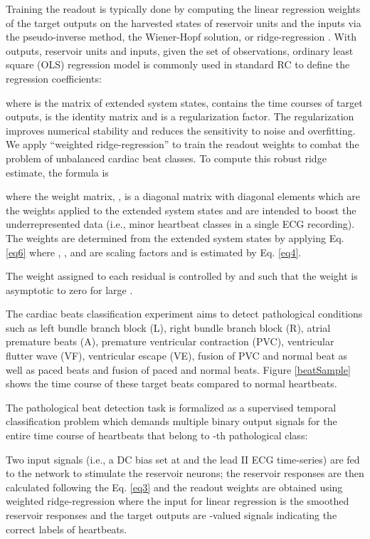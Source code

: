 \documentclass[review]{elsarticle}
\begin{document}
Training the readout is typically done by computing the linear regression weights of the target outputs on the harvested states of reservoir units and the inputs via the pseudo-inverse method, the Wiener-Hopf solution, or ridge-regression \cite{jaeger2001echo}. With  outputs,  reservoir units and  inputs, given the set  of  observations, ordinary least square (OLS) regression model is commonly used in standard RC to define the regression coefficients:


where  is the matrix of extended system states,  contains the time courses of target outputs,  is the identity matrix and  is a regularization
factor. The regularization improves numerical stability and reduces the sensitivity to noise and overfitting. We apply ``weighted ridge-regression'' \cite{ramsay1977comparative,montgomery2012introduction} to train the readout weights to combat the problem of unbalanced cardiac beat classes. To compute this robust ridge estimate, the formula is


where the weight matrix, , is a diagonal matrix with diagonal
elements  which are the weights applied to the extended system states and are intended to boost the underrepresented data (i.e., minor heartbeat classes in a single ECG recording). The weights  are determined from the extended system states by applying Eq. \ref{eq6} where , ,  and  are scaling factors and  is estimated by Eq. \ref{eq4}.



The weight assigned to each residual is controlled by  and  such that the weight is asymptotic to zero for large . 

The cardiac beats classification experiment aims to detect pathological conditions such as left bundle branch block (L), right bundle branch block (R), atrial premature beats (A), premature ventricular contraction (PVC), ventricular flutter wave (VF), ventricular escape (VE), fusion of PVC and normal beat as well as paced beats and fusion of paced and normal beats. Figure \ref{beatSample} shows the time course of these target beats compared to normal heartbeats. 

The pathological beat detection task is formalized as a supervised temporal classification problem which demands multiple binary output signals  for the entire time course of heartbeats that belong to -th pathological class:



Two input signals (i.e., a DC bias set at  and the lead II ECG time-series) are fed to the network to stimulate the reservoir neurons; the reservoir responses are then calculated following the Eq. \ref{eq3} and the readout weights are obtained using weighted ridge-regression where the input for linear regression is the smoothed reservoir responses and the target outputs are -valued signals indicating the correct labels of heartbeats.
\end{document}
